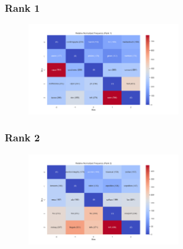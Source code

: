 \documentclass[11pt]{article}
\begin{document}
\subsubsection{Rank 1}
\begin{center}


\resizebox{\columnwidth}{!}
{
\TTRNFTable
}
\begin{figure}[h!]
  \includegraphics[width=0.6\textwidth]{figs/top_ten_rnf/rnf_w_rank_1.png}
\end{figure}
\end{center}

\pagebreak

\subsubsection{Rank 2}
\begin{center}


\resizebox{\columnwidth}{!}
{
\TTRNFTable
}
\begin{figure}[h!]
  \includegraphics[width=0.6\textwidth]{figs/top_ten_rnf/rnf_w_rank_2.png}
\end{figure}
\end{center}
\end{document}
